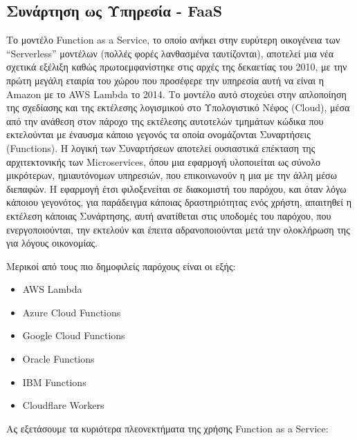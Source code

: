 \documentclass{article}
\begin{document}
\subsection{Συνάρτηση ως Υπηρεσία - FaaS}
Το μοντέλο Function as a Service, το οποίο ανήκει στην ευρύτερη οικογένεια των “Serverless” μοντέλων (πολλές φορές λανθασμένα ταυτίζονται), αποτελεί μια νέα σχετικά εξέλιξη καθώς πρωτοεμφανίστηκε στις αρχές της δεκαετίας του 2010, με την πρώτη μεγάλη εταιρία του χώρου που προσέφερε την υπηρεσία αυτή να είναι η Amazon με το AWS Lambda το 2014. Το μοντέλο αυτό στοχεύει στην απλοποίηση της σχεδίασης και της εκτέλεσης λογισμικού στο Υπολογιστικό Νέφος (Cloud), μέσα από την ανάθεση στον πάροχο της εκτέλεσης αυτοτελών τμημάτων κώδικα που εκτελούνται με έναυσμα κάποιο γεγονός τα οποία ονομάζονται Συναρτήσεις (Functions). Η λογική των Συναρτήσεων αποτελεί ουσιαστικά επέκταση της αρχιτεκτονικής των Microservices, όπου μια εφαρμογή υλοποιείται ως σύνολο μικρότερων, ημιαυτόνομων υπηρεσιών, που επικοινωνούν η μια με την άλλη μέσω διεπαφών. Η εφαρμογή έτσι φιλοξενείται σε διακομιστή του παρόχου, και όταν λόγω κάποιου γεγονότος, για παράδειγμα κάποιας δραστηριότητας ενός χρήστη, απαιτηθεί η εκτέλεση κάποιας Συνάρτησης, αυτή ανατίθεται στις υποδομές του παρόχου, που ενεργοποιούνται, την εκτελούν και έπειτα αδρανοποιούνται μετά την ολοκλήρωση της για λόγους οικονομίας. 

Μερικοί από τους πιο δημοφιλείς παρόχους είναι οι εξής:
\begin{itemize}
\item AWS Lambda
\item Azure Cloud Functions
\item Google Cloud Functions
\item Oracle Functions
\item IBM Functions
\item Cloudflare Workers
\end{itemize}
Ας εξετάσουμε τα κυριότερα πλεονεκτήματα της χρήσης Function as a Service:
\end{document}
